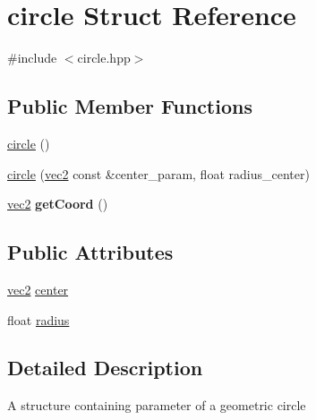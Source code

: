 \hypertarget{structcircle}{\section{circle Struct Reference}
\label{structcircle}
}


{\ttfamily \#include $<$circle.\-hpp$>$}

\subsection*{Public Member Functions}
\begin{DoxyCompactItemize}
\item 
\hyperlink{structcircle_a4e0786fc75051f3bbe5de2e08ef9712d}{circle} ()
\item 
\hyperlink{structcircle_a13bd963deb70b1ef5e5747c3478ef551}{circle} (\hyperlink{structvec2}{vec2} const \&center\-\_\-param, float radius\-\_\-center)
\item 
\hypertarget{structcircle_a1ce5660cf29852bee97341cfefa03655}{\hyperlink{structvec2}{vec2} {\bfseries get\-Coord} ()}\label{structcircle_a1ce5660cf29852bee97341cfefa03655}

\end{DoxyCompactItemize}
\subsection*{Public Attributes}
\begin{DoxyCompactItemize}
\item 
\hyperlink{structvec2}{vec2} \hyperlink{structcircle_ae816534fba5132b6db750022a50cc35e}{center}
\item 
float \hyperlink{structcircle_a4724daa580ad7e0516ba108cb2a41364}{radius}
\end{DoxyCompactItemize}


\subsection{Detailed Description}
A structure containing parameter of a geometric circle 

